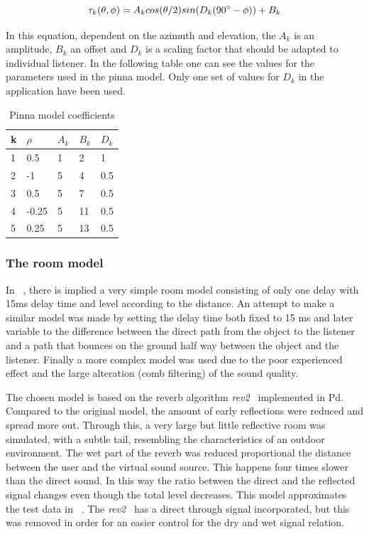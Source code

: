 \documentclass[journal]{IEEEtran}
\begin{document}
\begin{equation}\label{eq:pinna}
\tau_{k}(\theta,\phi) = A_{k}cos(\theta/2)sin(D_{k}(90\degree-\phi)) + B_{k}
\end{equation} 

In this equation, dependent on the azimuth and elevation, the $A_{k}$ is an amplitude, $B_{k}$ an offset and $D_{k}$ is a scaling factor that should be adapted to individual listener. 
In the following table one can see the values for the parameters used in the pinna model. Only one set of values for $D_{k}$ in the application have been used.

\begin{table}[h]
\centering
\caption{Pinna model coefficients}
\label{PinnaModel parameters}
\begin{tabular}{|l|l|l|l|l|}
\hline
k & $\rho$  & $A_{k}$ & $B_{k}$  & $D_{k}$   \\ \hline
1 & 0.5   & 1 & 2  & 1   \\ \hline
2 & -1    & 5 & 4  & 0.5 \\ \hline
3 & 0.5   & 5 & 7  & 0.5 \\ \hline
4 & -0.25 & 5 & 11 & 0.5 \\ \hline
5 & 0.25  & 5 & 13 & 0.5 \\ \hline
\end{tabular}
\end{table}



\subsubsection{The room model}
In ~\cite{Brown1997}, there is implied a very simple room model consisting of only one delay with 15ms delay time and level according to the distance. An attempt to make a similar model was made by setting the delay time both fixed to 15 ms and later variable to the difference between the direct path from the object to the listener and a path that bounces on the ground half way between the object and the listener. Finally a more complex model was used due to the poor experienced effect and the large alteration (comb filtering) of the sound quality.

The chosen model is based on the reverb algorithm \textit{rev2~} implemented in Pd. Compared to the original model, the amount of early reflections were reduced and spread more out. Through this, a very large but little reflective room was simulated, with a subtle tail, resembling the characteristics of an outdoor environment.  The wet part of the reverb was reduced proportional the distance between the user and the virtual sound source. This happens four times slower than the direct sound. In this way the ratio between the direct and the reflected signal changes even though the total level decreases. This model approximates the test data in ~\cite{begault19943}. The \textit{rev2~} has a direct through signal incorporated, but this was removed in order for an easier control for the dry and wet signal relation.
\end{document}
